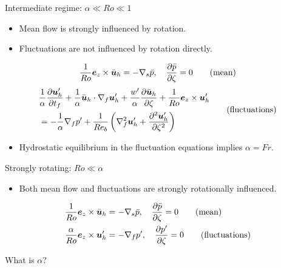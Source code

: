 \documentclass{beamer}
\begin{document}
\begin{frame}{Intermediate regime: $\alpha \ll Ro \ll 1$}

    \begin{itemize}
        \item Mean flow is strongly influenced by rotation.
        \item Fluctuations are not influenced by rotation directly. 
    \end{itemize}
    {\footnotesize
    \begin{gather*}
        \frac{1}{Ro}\boldsymbol{e}_z \times \bar{\boldsymbol{u}}_h = -\nabla_s \bar{p}, \quad \frac{\partial \bar{p}}{\partial \zeta} = 0 \tag{mean}
    \end{gather*} 
    \begin{equation*}
        \begin{split}
        &\frac{1}{\alpha}\frac{\partial \boldsymbol{u}_h'}{\partial t_f} 
        + \frac{1}{\alpha}\bar{\boldsymbol{u}}_h\cdot\nabla_f\boldsymbol{u}_h'
        + \frac{w'}{\alpha}\frac{\partial \bar{\boldsymbol{u}}_h}{\partial \zeta} + \frac{1}{Ro}\boldsymbol{e}_z \times \boldsymbol{u}'_h\\ 
        &= -\frac{1}{\alpha}\nabla_f p' + \frac{1}{Re_b}\left( \nabla_f^2\boldsymbol{u}_h' + \frac{\partial^2 \boldsymbol{u}_h'}{\partial \zeta^2}\right) 
        \end{split}
        \tag{fluctuations}
    \end{equation*}
    }
    
    \begin{itemize}
    
    \item Hydrostatic equilibrium in the fluctuation equations implies $\alpha = Fr$. 
\end{itemize}
\end{frame}

\begin{frame}{Strongly rotating: $Ro \ll \alpha$}

    \begin{itemize}
        \item Both mean flow and fluctuations are strongly rotationally influenced.
    \end{itemize}

    \begin{align*}
        \frac{1}{Ro}\boldsymbol{e}_z \times \bar{\boldsymbol{u}}_h &= -\nabla_s \bar{p}, \quad \frac{\partial \bar{p}}{\partial \zeta} = 0 \tag{mean}\\
        \frac{\alpha}{Ro}\boldsymbol{e}_z \times \boldsymbol{u}'_h &= -\nabla_f p', \quad \frac{\partial p'}{\partial \zeta} = 0 \tag{fluctuations}
    \end{align*} 

    What is $\alpha$?
\end{frame}
\end{document}
